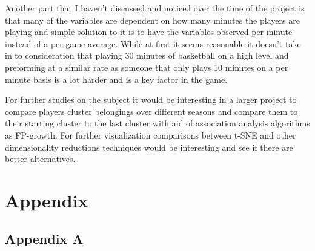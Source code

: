 \documentclass{article}
\begin{document}
Another part that I haven’t discussed and noticed over the time of the project is that many of the variables are dependent on how many minutes the players are playing and simple solution to it is to have the variables observed per minute instead of a per game average. While at first it seems reasonable it doesn't take in to consideration that playing 30 minutes of basketball on a high level and preforming at a similar rate as someone that only plays 10 minutes on a per minute basis is a lot harder and is a key factor in the game.

For further studies on the subject it would be interesting in a larger project to compare players cluster belongings over different seasons and compare them to their starting cluster to the last cluster with aid of association analysis algorithms as FP-growth. For further visualization comparisons between t-SNE and other dimensionality reductions techniques would be interesting and see if there are better alternatives.



\section{Appendix}
\subsection{Appendix A}
\end{document}
